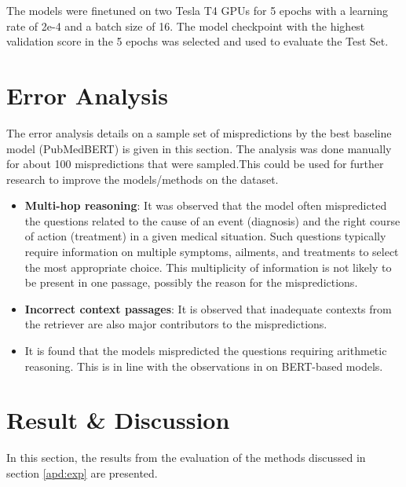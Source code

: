 \documentclass[pmlr,twocolumn,10pt]{jmlr}
\begin{document}
The models were finetuned on two Tesla T4 GPUs for 5 epochs with a learning rate of 2e-4 and a batch size of 16. The model checkpoint with the highest validation score in the 5 epochs was selected and used to evaluate the Test Set.

\section{Error Analysis}\label{apd:error_anaysis}
The error analysis details on a sample set of mispredictions by the best baseline model (PubMedBERT) is given in this section. The analysis was done manually for about 100 mispredictions that were sampled.This could be used for further research to improve the models/methods on the dataset.

\begin{itemize}
    \item \textbf{Multi-hop reasoning}: It was observed that the model often mispredicted the questions related to the cause of an event (diagnosis) and the right course of action (treatment) in a given medical situation. Such questions typically require information on multiple symptoms, ailments, and treatments to select the most appropriate choice. This multiplicity of information is not likely to be present in one passage, possibly the reason for the mispredictions.
    \item \textbf{Incorrect context passages}: It is observed that inadequate contexts from the retriever are also major contributors to the mispredictions.
    \item It is found that the models mispredicted the questions requiring arithmetic reasoning. This is in line with the observations in \citep{Dua2019} on BERT-based models.
\end{itemize}

\section{Result \& Discussion}

In this section, the results from the evaluation of the methods discussed in section \ref{apd:exp} are presented.
\end{document}
